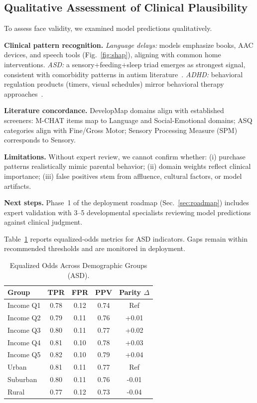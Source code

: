 \documentclass[conference]{IEEEtran}
\theoremstyle{plain}
\theoremstyle{remark}
\begin{document}
\subsection{Qualitative Assessment of Clinical Plausibility}
To assess face validity, we examined model predictions qualitatively.

\textbf{Clinical pattern recognition.}
\emph{Language delays:} models emphasize books, AAC devices, and speech tools (Fig.~\ref{fig:shap}), aligning with common home interventions.
\emph{ASD:} a sensory+feeding+sleep triad emerges as strongest signal, consistent with comorbidity patterns in autism literature~\cite{sensoryreview,sleepasd}.
\emph{ADHD:} behavioral regulation products (timers, visual schedules) mirror behavioral therapy approaches~\cite{adhdbehavior}.

\textbf{Literature concordance.}
DevelopMap domains align with established screeners: M-CHAT items map to Language and Social-Emotional domains; ASQ categories align with Fine/Gross Motor; Sensory Processing Measure (SPM) corresponds to Sensory.

\textbf{Limitations.}
Without expert review, we cannot confirm whether: (i) purchase patterns realistically mimic parental behavior; (ii) domain weights reflect clinical importance; (iii) false positives stem from affluence, cultural factors, or model artifacts.

\textbf{Next steps.}
Phase~1 of the deployment roadmap (Sec.~\ref{sec:roadmap}) includes expert validation with 3--5 developmental specialists reviewing model predictions against clinical judgment.

Table~\ref{tab:fair} reports equalized-odds metrics for ASD indicators. Gaps remain within recommended thresholds and are monitored in deployment.

\begin{table}[t]
\centering
\caption{Equalized Odds Across Demographic Groups (ASD).}
\label{tab:fair}
\begin{tabular}{lcccc}
\toprule
Group & TPR & FPR & PPV & Parity $\Delta$\\
\midrule
Income Q1 & 0.78 & 0.12 & 0.74 & Ref\\
Income Q2 & 0.79 & 0.11 & 0.76 & +0.01\\
Income Q3 & 0.80 & 0.11 & 0.77 & +0.02\\
Income Q4 & 0.81 & 0.10 & 0.78 & +0.03\\
Income Q5 & 0.82 & 0.10 & 0.79 & +0.04\\
\midrule
Urban & 0.81 & 0.11 & 0.77 & Ref\\
Suburban & 0.80 & 0.11 & 0.76 & -0.01\\
Rural & 0.77 & 0.12 & 0.73 & -0.04\\
\bottomrule
\end{tabular}
\end{table}
\end{document}
